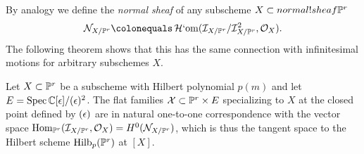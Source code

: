 By analogy we define the
\emph{normal sheaf} of any subscheme $X\subset
\index{normal!sheaf}%
\PP^r$
$$
\sN_{X/\PP^r} \colonequals  \sHom(\sI_{X/\PP^r}/\sI_{X/\PP^r}^2, \sO_X).
$$
The following theorem shows that this
has the same connection with infinitesimal motions for arbitrary
subschemes $X$.

\begin{theorem}
\label{tangent space of Hilb}
Let $X\subset \PP^r$ be a subscheme with Hilbert polynomial $p(m)$ and let
$E = \Spec\CC[\eps]/(\eps)^{2}$. The flat families
$\sX \subset \PP^r\times E$ specializing to $X$ at the closed point
defined by $(\eps)$
are in natural one-to-one correspondence with the vector space
%
$\Hom_{\PP^r}(\sI_{X/\PP^r}, \sO_X) = H^0(\sN_{X/\PP^r})$, which is thus
the tangent space to the Hilbert scheme $\Hilb_{p}(\PP^r)$ at $[X]$.
\end{theorem}

